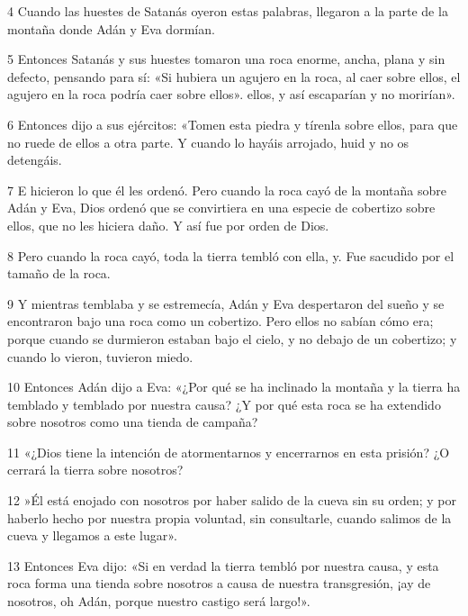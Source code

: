 \par 4 Cuando las huestes de Satanás oyeron estas palabras, llegaron a la parte de la montaña donde Adán y Eva dormían.

\par 5 Entonces Satanás y sus huestes tomaron una roca enorme, ancha, plana y sin defecto, pensando para sí: «Si hubiera un agujero en la roca, al caer sobre ellos, el agujero en la roca podría caer sobre ellos». ellos, y así escaparían y no morirían».

\par 6 Entonces dijo a sus ejércitos: «Tomen esta piedra y tírenla sobre ellos, para que no ruede de ellos a otra parte. Y cuando lo hayáis arrojado, huid y no os detengáis.

\par 7 E hicieron lo que él les ordenó. Pero cuando la roca cayó de la montaña sobre Adán y Eva, Dios ordenó que se convirtiera en una especie de cobertizo sobre ellos, que no les hiciera daño. Y así fue por orden de Dios.

\par 8 Pero cuando la roca cayó, toda la tierra tembló con ella, y. Fue sacudido por el tamaño de la roca.

\par 9 Y mientras temblaba y se estremecía, Adán y Eva despertaron del sueño y se encontraron bajo una roca como un cobertizo. Pero ellos no sabían cómo era; porque cuando se durmieron estaban bajo el cielo, y no debajo de un cobertizo; y cuando lo vieron, tuvieron miedo.

\par 10 Entonces Adán dijo a Eva: «¿Por qué se ha inclinado la montaña y la tierra ha temblado y temblado por nuestra causa? ¿Y por qué esta roca se ha extendido sobre nosotros como una tienda de campaña?

\par 11 «¿Dios tiene la intención de atormentarnos y encerrarnos en esta prisión? ¿O cerrará la tierra sobre nosotros?

\par 12 »Él está enojado con nosotros por haber salido de la cueva sin su orden; y por haberlo hecho por nuestra propia voluntad, sin consultarle, cuando salimos de la cueva y llegamos a este lugar».

\par 13 Entonces Eva dijo: «Si en verdad la tierra tembló por nuestra causa, y esta roca forma una tienda sobre nosotros a causa de nuestra transgresión, ¡ay de nosotros, oh Adán, porque nuestro castigo será largo!».

